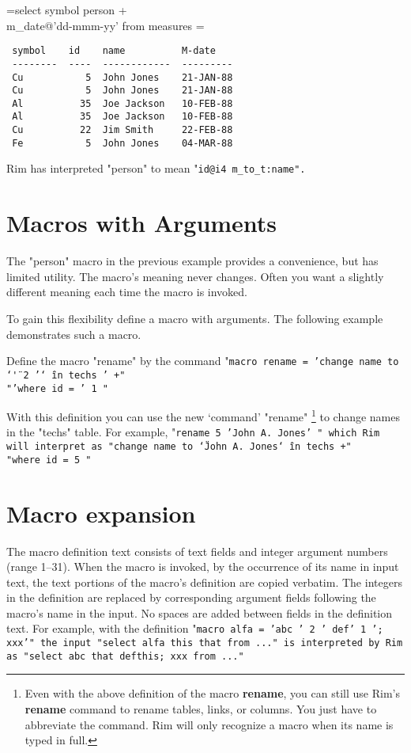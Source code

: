 \documentclass[11pt,a4paper]{report}
\def\Rimdemo#1{\par\bigskip\toks0={#1}
  \setbox\Rimdemobox=\vbox\bgroup\hsize=24pc\scriptsize}
\def\enddemo{\egroup\noindent\fbox{\parbox{355pt}{%
  \vspace{1ex}
  {\tt\begin{tabular}{l}\the\toks0\end{tabular}\par}
  \vspace{1ex}
  \makebox[355pt]{\hfill\fbox{\fbox{\box\Rimdemobox}}\hskip1ex}\vspace{1ex}}}}
\def\I{\index}
\begin{document}
\I{select}
\Rimdemo{select symbol person +\\
 \qquad m_date@'dd-mmm-yy' from measures}
\begin{verbatim}
 symbol    id    name          M-date
 --------  ----  ------------  ---------
 Cu           5  John Jones    21-JAN-88
 Cu           5  John Jones    21-JAN-88
 Al          35  Joe Jackson   10-FEB-88
 Al          35  Joe Jackson   10-FEB-88
 Cu          22  Jim Smith     22-FEB-88
 Fe           5  John Jones    04-MAR-88
\end{verbatim}
 
Rim has interpreted "person" to mean
"\tt id@i4 m\_to\_t:name".
 
\section{Macros with Arguments}
The "person" macro in the previous example provides a convenience,
but has limited utility.  The macro's meaning never changes.
Often you want a slightly different meaning
each time the macro is invoked.
 
To gain this flexibility define a macro
with arguments.
\I{argument}
The following example demonstrates such a macro.
 
Define the macro "rename" by the command
"\tt macro rename = 'change name to \char`\"' 2 '\char`\"\ in techs ' +"\\
   \qquad "\tt 'where id = ' 1 "
\label{rename-def}
 
With this definition
you can use the new `command' "rename"%
   \footnote{ Even with the above definition of the macro
   {\bf rename}, you can
    still use Rim's {\bf rename} command to rename tables, links, or
   columns.  You just have to abbreviate the command.
   Rim will only recognize a macro when its name
   is typed in full.}
to change names in
the "techs" table. For example,
"\tt rename 5 'John A. Jones' "
which Rim will interpret as
"\tt change name to \char`\"John A. Jones\char`\"\ in techs +"\\
   \qquad "\tt where id = 5 "
 
\section{Macro expansion}
The macro definition text consists of text fields
and integer argument numbers (range 1--31).
When the macro is invoked,
by the occurrence of its name in input text, the text portions
of the macro's definition are copied verbatim.  The integers
in the definition are replaced by corresponding argument
fields following the macro's name in the input.
No spaces are added between fields in the definition text.
For example, with the definition
"\tt macro alfa = 'abc ' 2 ' def' 1 '; xxx'"
the input
"\tt select alfa this that from ..."
is interpreted by Rim as
"\tt select abc that defthis; xxx from ..."
 
\end{document}
